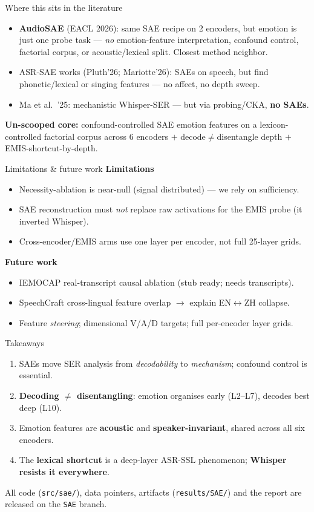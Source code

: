 \documentclass[aspectratio=169]{beamer}
\begin{document}
\begin{frame}{Where this sits in the literature}
\begin{itemize}
  \item \textbf{AudioSAE} (EACL 2026): same SAE recipe on 2 encoders, but emotion is just one probe task --- \emph{no} emotion-feature interpretation, confound control, factorial corpus, or acoustic/lexical split. Closest method neighbor.
  \item ASR-SAE works (Pluth'26; Mariotte'26): SAEs on speech, but find phonetic/lexical or singing features --- no affect, no depth sweep.
  \item Ma et al.\ '25: mechanistic Whisper-SER --- but via probing/CKA, \textbf{no SAEs}.
\end{itemize}
\medskip
\textbf{Un-scooped core:} confound-controlled SAE emotion features on a lexicon-controlled factorial corpus across 6 encoders $+$ decode$\neq$disentangle depth $+$ EMIS-shortcut-by-depth.
\end{frame}

\begin{frame}{Limitations \& future work}
\textbf{Limitations}
\begin{itemize}
  \item Necessity-ablation is near-null (signal distributed) --- we rely on sufficiency.
  \item SAE reconstruction must \emph{not} replace raw activations for the EMIS probe (it inverted Whisper).
  \item Cross-encoder/EMIS arms use one layer per encoder, not full 25-layer grids.
\end{itemize}
\textbf{Future work}
\begin{itemize}
  \item IEMOCAP real-transcript causal ablation (stub ready; needs transcripts).
  \item SpeechCraft cross-lingual feature overlap $\to$ explain EN$\leftrightarrow$ZH collapse.
  \item Feature \emph{steering}; dimensional V/A/D targets; full per-encoder layer grids.
\end{itemize}
\end{frame}

\begin{frame}{Takeaways}
\begin{enumerate}
  \item SAEs move SER analysis from \emph{decodability} to \emph{mechanism}; confound control is essential.
  \item \textbf{Decoding $\neq$ disentangling}: emotion organises early (L2--L7), decodes best deep (L10).
  \item Emotion features are \textbf{acoustic} and \textbf{speaker-invariant}, shared across all six encoders.
  \item The \textbf{lexical shortcut} is a deep-layer ASR-SSL phenomenon; \textbf{Whisper resists it everywhere}.
\end{enumerate}
\vfill
\footnotesize All code (\texttt{src/sae/}), data pointers, artifacts (\texttt{results/SAE/}) and the report are released on the \texttt{SAE} branch.
\end{frame}
\end{document}
